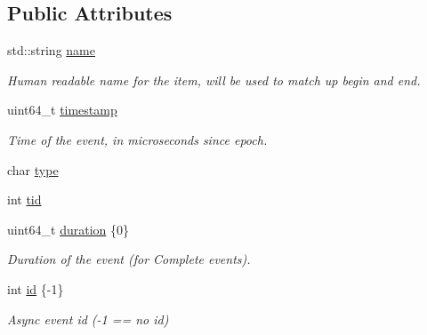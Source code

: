 \subsection*{Public Attributes}
\begin{DoxyCompactItemize}
\item 
\mbox{\label{structglow_1_1_trace_event_ab99556f1d824a41d64538b7cd61ed7f9}} 
std\+::string \hyperlink{structglow_1_1_trace_event_ab99556f1d824a41d64538b7cd61ed7f9}{name}
\begin{DoxyCompactList}\small\item\em Human readable name for the item, will be used to match up begin and end. \end{DoxyCompactList}\item 
\mbox{\label{structglow_1_1_trace_event_a86e36f81eebb4c661445019a8dc75fb5}} 
uint64\+\_\+t \hyperlink{structglow_1_1_trace_event_a86e36f81eebb4c661445019a8dc75fb5}{timestamp}
\begin{DoxyCompactList}\small\item\em Time of the event, in microseconds since epoch. \end{DoxyCompactList}\item 
char \hyperlink{structglow_1_1_trace_event_a959851b24699050f16b536c8a2807dbd}{type}
\item 
int \hyperlink{structglow_1_1_trace_event_a8babcdea3902b2e13327f4006fbbd6c2}{tid}
\item 
\mbox{\label{structglow_1_1_trace_event_a7cc8e0e7a3453c34a8f4cbd1b859fa0a}} 
uint64\+\_\+t \hyperlink{structglow_1_1_trace_event_a7cc8e0e7a3453c34a8f4cbd1b859fa0a}{duration} \{0\}
\begin{DoxyCompactList}\small\item\em Duration of the event (for Complete events). \end{DoxyCompactList}\item 
\mbox{\label{structglow_1_1_trace_event_a32f0202a8652f98dd419161416403fae}} 
int \hyperlink{structglow_1_1_trace_event_a32f0202a8652f98dd419161416403fae}{id} \{-\/1\}
\begin{DoxyCompactList}\small\item\em Async event id (-\/1 == no id) \end{DoxyCompactList}\item 

\end{DoxyCompactItemize}
